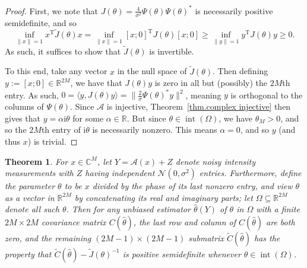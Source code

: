 \documentclass[times,10pt]{elsarticle}
\theoremstyle{plain}
\newtheorem{theorem}{Theorem}
\begin{document}
\begin{proof}
First, we note that $J(\theta)=\frac{4}{\sigma^2}\Psi(\theta)\Psi(\theta)^*$ is necessarily positive semidefinite, and so 
\begin{equation*}
\inf_{\|x\|=1}x^\mathrm{T}\tilde{J}(\theta)x
=\inf_{\|x\|=1}[x; 0]^\mathrm{T}J(\theta)[x; 0]
\geq\inf_{\|y\|=1}y^\mathrm{T}J(\theta)y
\geq0.
\end{equation*}
As such, it suffices to show that $\tilde{J}(\theta)$ is invertible.

To this end, take any vector $x$ in the null space of $\widetilde{J}(\theta)$.
Then defining $y:=[x; 0]\in\mathbb{R}^{2M}$, we have that $J(\theta)y$ is zero in all but (possibly) the $2M$th entry.
As such, $0=\langle y,J(\theta)y\rangle=\|\frac{2}{\sigma}\Psi(\theta)^*y\|^2$, meaning $y$ is orthogonal to the columns of $\Psi(\theta)$.
Since $\mathcal{A}$ is injective, Theorem~\ref{thm.complex injective} then gives that $y=\alpha\mathrm{i}\theta$ for some $\alpha\in\mathbb{R}$.
But since $\theta\in\operatorname{int}(\Omega)$, we have $\theta_M>0$, and so the $2M$th entry of $\mathrm{i}\theta$ is necessarily nonzero.
This means $\alpha=0$, and so $y$ (and thus $x$) is trivial.
\qquad
\end{proof}

\begin{theorem}
\label{thm.complex random stability}
For $x\in\mathbb{C}^M$, let $Y=\mathcal{A}(x)+Z$ denote noisy intensity measurements with $Z$ having independent $\mathcal{N}(0,\sigma^2)$ entries.
Furthermore, define the parameter $\theta$ to be $x$ divided by the phase of its last nonzero entry, and view $\theta$ as a vector in $\mathbb{R}^{2M}$ by concatenating its real and imaginary parts; let $\Omega\subseteq\mathbb{R}^{2M}$ denote all such $\theta$.
Then for any unbiased estimator $\hat{\theta}(Y)$ of $\theta$ in $\Omega$ with a finite $2M\times 2M$ covariance matrix $C(\hat{\theta})$, the last row and column of $C(\hat{\theta})$ are both zero, and the remaining $(2M-1)\times(2M-1)$ submatrix $\widetilde{C}(\hat{\theta})$ has the property that $\widetilde{C}(\hat{\theta})-\widetilde{J}(\theta)^{-1}$ is positive semidefinite whenever $\theta\in\operatorname{int}(\Omega)$. 
\end{theorem}
\end{document}
